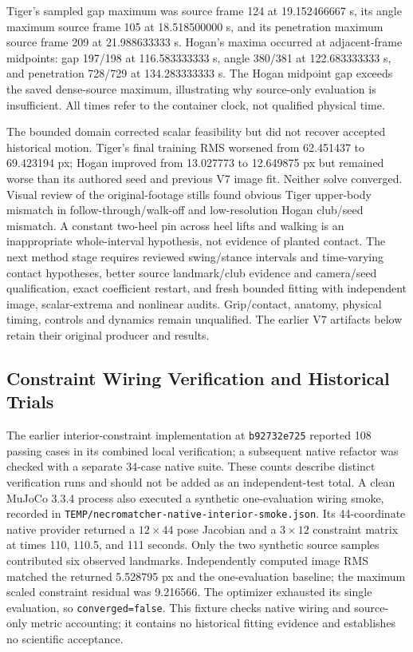 \documentclass[11pt,letterpaper]{article}
\newcommand{\code}[1]{\nolinkurl{#1}}
\begin{document}
Tiger's sampled gap maximum was source frame 124 at 19.152466667 s, its
angle maximum source frame 105 at 18.518500000 s, and its penetration maximum
source frame 209 at 21.988633333 s. Hogan's maxima occurred at adjacent-frame
midpoints: gap 197/198 at 116.583333333 s, angle 380/381 at 122.683333333 s,
and penetration 728/729 at 134.283333333 s. The Hogan midpoint gap exceeds
the saved dense-source maximum, illustrating why source-only evaluation is
insufficient. All times refer to the container clock, not qualified physical time.

The bounded domain corrected scalar feasibility but did not recover accepted
historical motion. Tiger's final training RMS worsened from 62.451437 to
69.423194 px; Hogan improved from 13.027773 to 12.649875 px but remained worse
than its authored seed and previous V7 image fit. Neither solve converged.
Visual review of the original-footage stills found obvious Tiger upper-body
mismatch in follow-through/walk-off and low-resolution Hogan club/seed
mismatch. A constant two-heel pin across heel lifts and walking is an
inappropriate whole-interval hypothesis, not evidence of planted contact.
The next method stage requires reviewed swing/stance intervals and time-varying
contact hypotheses, better source landmark/club evidence and camera/seed
qualification, exact coefficient restart, and fresh bounded fitting with
independent image, scalar-extrema and nonlinear audits. Grip/contact,
anatomy, physical timing, controls and dynamics remain unqualified.
The earlier V7 artifacts below retain their original producer and results.

\subsection{Constraint Wiring Verification and Historical Trials}
The earlier interior-constraint implementation at \code{b92732e725} reported
108 passing cases in its combined local verification;
a subsequent native refactor was checked with a separate 34-case native suite.
These counts describe distinct verification runs and should not be added as an
independent-test total. A clean MuJoCo 3.3.4 process also executed a synthetic
one-evaluation wiring smoke, recorded in
\code{TEMP/necromatcher-native-interior-smoke.json}. Its 44-coordinate native
provider returned a $12\times44$ pose Jacobian and a $3\times12$ constraint
matrix at times 110, 110.5, and 111 seconds. Only the two synthetic source
samples contributed six observed landmarks. Independently computed image RMS
matched the returned 5.528795 px and the one-evaluation baseline; the maximum
scaled constraint residual was 9.216566. The optimizer exhausted its single
evaluation, so \code{converged=false}. This fixture checks native wiring and
source-only metric accounting; it contains no historical fitting evidence and
establishes no scientific acceptance.
\end{document}
